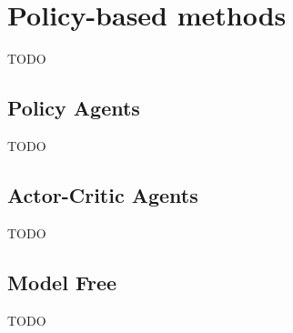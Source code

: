 \section{Policy-based methods}
TODO

%

\subsection{Policy Agents}\label{subsec:policy-agents}
TODO

\subsection{Actor-Critic Agents}\label{subsec:actor-critic-agents}
TODO

%
%
%



\subsection{Model Free}
TODO


